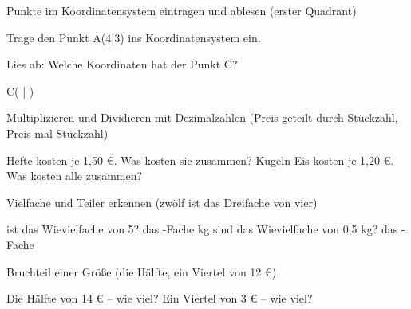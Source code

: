 \setcounter{aufgabe}{0}

\begin{aufgabe}{Punkte im Koordinatensystem eintragen und ablesen (erster Quadrant)}
\begin{teile}
\teil Trage den Punkt A(4|3) ins Koordinatensystem ein.

\begin{ksys}[xmin=0,xmax=6,ymin=0,ymax=6]\end{ksys}
\teil Lies ab: Welche Koordinaten hat der Punkt C?

\begin{ksys}[xmin=0,xmax=6,ymin=0,ymax=6,ablesen]\end{ksys}
C( \leerfeld | \leerfeld )
\end{teile}
\end{aufgabe}

\begin{aufgabe}{Multiplizieren und Dividieren mit Dezimalzahlen (Preis geteilt durch Stückzahl, Preis mal Stückzahl)}
\begin{teile}
 Hefte kosten je 1,50 €. Was kosten sie zusammen? \leerfeld[€]
 Kugeln Eis kosten je 1,20 €. Was kosten alle zusammen? \leerfeld[€]
\end{teile}
\end{aufgabe}

\begin{aufgabe}{Vielfache und Teiler erkennen (zwölf ist das Dreifache von vier)}
\begin{teile}
 ist das Wievielfache von 5? das \leerfeld -Fache
 kg sind das Wievielfache von 0,5 kg? das \leerfeld -Fache
\end{teile}
\end{aufgabe}

\begin{aufgabe}{Bruchteil einer Größe (die Hälfte, ein Viertel von 12 €)}
\begin{teile}
\teil Die Hälfte von 14 € – wie viel? \leerfeld[€]
\teil Ein Viertel von 3 € – wie viel? \leerfeld[€]
\end{teile}
\end{aufgabe}

